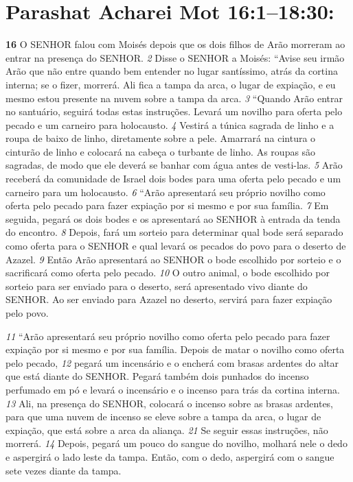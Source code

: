 \section*{Parashat Acharei Mot 16:1–18:30:}  

 
\textbf{\large 16}
 O SENHOR falou com Moisés depois que os dois filhos de Arão morreram ao
entrar na presença do SENHOR. 
\textit{\tiny 2} 
Disse o SENHOR a Moisés: “Avise seu irmão Arão
que não entre quando bem entender no lugar santíssimo, atrás da cortina interna;
se o fizer, morrerá. Ali fica a tampa da arca, o lugar de expiação, e eu mesmo estou
presente na nuvem sobre a tampa da arca. 
\textit{\tiny 3} 
“Quando Arão entrar no santuário, seguirá todas estas instruções. Levará um
novilho para oferta pelo pecado e um carneiro para holocausto. 
\textit{\tiny 4} 
Vestirá a túnica
sagrada de linho e a roupa de baixo de linho, diretamente sobre a pele. Amarrará
na cintura o cinturão de linho e colocará na cabeça o turbante de linho. As roupas
são sagradas, de modo que ele deverá se banhar com água antes de vesti-las. 
\textit{\tiny 5} 
Arão receberá da comunidade de Israel dois bodes para uma oferta pelo pecado
e um carneiro para um holocausto. 
\textit{\tiny 6} 
“Arão apresentará seu próprio novilho como oferta pelo pecado para fazer
expiação por si mesmo e por sua família. 
\textit{\tiny 7} 
Em seguida, pegará os dois bodes e os
apresentará ao SENHOR à entrada da tenda do encontro. 
\textit{\tiny 8} 
Depois, fará um sorteio
para determinar qual bode será separado como oferta para o SENHOR e qual levará
os pecados do povo para o deserto de Azazel. 
\textit{\tiny 9} 
Então Arão apresentará ao SENHOR
o bode escolhido por sorteio e o sacrificará como oferta pelo pecado. 
\textit{\tiny 10}
O outro
animal, o bode escolhido por sorteio para ser enviado para o deserto, será
apresentado vivo diante do SENHOR. Ao ser enviado para Azazel no deserto, servirá
para fazer expiação pelo povo.
   
\textit{\tiny 11}
“Arão apresentará seu próprio novilho como oferta pelo pecado para fazer
expiação por si mesmo e por sua família. Depois de matar o novilho como oferta
pelo pecado, 
\textit{\tiny 12}
pegará um incensário e o encherá com brasas ardentes do altar
que está diante do SENHOR. Pegará também dois punhados do incenso perfumado
em pó e levará o incensário e o incenso para trás da cortina interna. 
\textit{\tiny 13}
Ali, na
presença do SENHOR, colocará o incenso sobre as brasas ardentes, para que uma
nuvem de incenso se eleve sobre a tampa da arca, o lugar de expiação, que está
sobre a arca da aliança.
\textit{\tiny 21}
 Se seguir essas instruções, não morrerá. 
\textit{\tiny 14}
Depois,
pegará um pouco do sangue do novilho, molhará nele o dedo e aspergirá o lado
leste da tampa. Então, com o dedo, aspergirá com o sangue sete vezes diante da
tampa.
   
